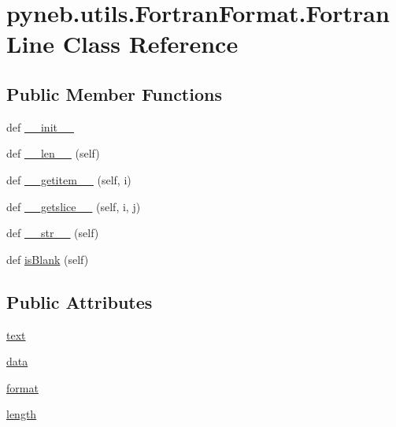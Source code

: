 \hypertarget{classpyneb_1_1utils_1_1_fortran_format_1_1_fortran_line}{}\section{pyneb.\+utils.\+Fortran\+Format.\+Fortran\+Line Class Reference}
\label{classpyneb_1_1utils_1_1_fortran_format_1_1_fortran_line}
\subsection*{Public Member Functions}
\begin{DoxyCompactItemize}
\item 
def \hyperlink{classpyneb_1_1utils_1_1_fortran_format_1_1_fortran_line_a292ba8e3d93bd751d6d13fdc1671ccb2}{\+\_\+\+\_\+init\+\_\+\+\_\+}
\item 
def \hyperlink{classpyneb_1_1utils_1_1_fortran_format_1_1_fortran_line_ac8b694644f83c524f84a3f093c5309e3}{\+\_\+\+\_\+len\+\_\+\+\_\+} (self)
\item 
def \hyperlink{classpyneb_1_1utils_1_1_fortran_format_1_1_fortran_line_a1fc8a0bef1841d12d258cff06e2c5c4d}{\+\_\+\+\_\+getitem\+\_\+\+\_\+} (self, i)
\item 
def \hyperlink{classpyneb_1_1utils_1_1_fortran_format_1_1_fortran_line_a623c152bf4892c671290b6f9dcb0fee4}{\+\_\+\+\_\+getslice\+\_\+\+\_\+} (self, i, j)
\item 
def \hyperlink{classpyneb_1_1utils_1_1_fortran_format_1_1_fortran_line_a02ccdba49c33daca4eb4187d3aa23057}{\+\_\+\+\_\+str\+\_\+\+\_\+} (self)
\item 
def \hyperlink{classpyneb_1_1utils_1_1_fortran_format_1_1_fortran_line_aaa590d7811b69dd963ffdc5510787101}{is\+Blank} (self)
\end{DoxyCompactItemize}
\subsection*{Public Attributes}
\begin{DoxyCompactItemize}
\item 
\hyperlink{classpyneb_1_1utils_1_1_fortran_format_1_1_fortran_line_a70d4893b8dd8ae61297b1d3e4b8bc612}{text}
\item 
\hyperlink{classpyneb_1_1utils_1_1_fortran_format_1_1_fortran_line_a5976b8e1d4375a2ea62b9359bcf84697}{data}
\item 
\hyperlink{classpyneb_1_1utils_1_1_fortran_format_1_1_fortran_line_ae97c8744bdb9817ec8a9c58b7a6bfe20}{format}
\item 
\hyperlink{classpyneb_1_1utils_1_1_fortran_format_1_1_fortran_line_a4cd0f5ee28f8250f2c6fbbb9ff890e0a}{length}
\end{DoxyCompactItemize}
